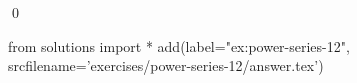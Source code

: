 
    \begin{ex}
  \label{ex:power-series-12}
  
  \qed
\end{ex}
\begin{python0}
from solutions import *
add(label="ex:power-series-12",
    srcfilename='exercises/power-series-12/answer.tex') 
\end{python0}                              
